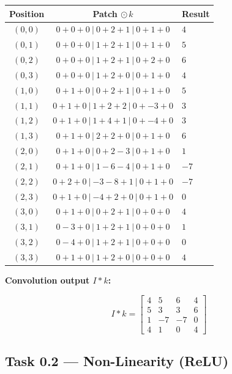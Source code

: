\documentclass[12pt,a4paper]{article}
\begin{document}
\medskip
\begin{center}
\renewcommand{\arraystretch}{1.3}
\begin{tabular}{ccl}
\toprule
Position & Patch $\odot\, k$ & Result \\
\midrule
$(0,0)$ & $0{+}0{+}0\ |\ 0{+}2{+}1\ |\ 0{+}1{+}0$ & $4$ \\
$(0,1)$ & $0{+}0{+}0\ |\ 1{+}2{+}1\ |\ 0{+}1{+}0$ & $5$ \\
$(0,2)$ & $0{+}0{+}0\ |\ 1{+}2{+}1\ |\ 0{+}2{+}0$ & $6$ \\
$(0,3)$ & $0{+}0{+}0\ |\ 1{+}2{+}0\ |\ 0{+}1{+}0$ & $4$ \\
$(1,0)$ & $0{+}1{+}0\ |\ 0{+}2{+}1\ |\ 0{+}1{+}0$ & $5$ \\
$(1,1)$ & $0{+}1{+}0\ |\ 1{+}2{+}2\ |\ 0{+}{-3}{+}0$ & $3$ \\
$(1,2)$ & $0{+}1{+}0\ |\ 1{+}4{+}1\ |\ 0{+}{-4}{+}0$ & $3$ \\
$(1,3)$ & $0{+}1{+}0\ |\ 2{+}2{+}0\ |\ 0{+}1{+}0$ & $6$ \\
$(2,0)$ & $0{+}1{+}0\ |\ 0{+}2{-}3\ |\ 0{+}1{+}0$ & $1$ \\
$(2,1)$ & $0{+}1{+}0\ |\ 1{-}6{-}4\ |\ 0{+}1{+}0$ & $-7$ \\
$(2,2)$ & $0{+}2{+}0\ |\ {-3}{-}8{+}1\ |\ 0{+}1{+}0$ & $-7$ \\
$(2,3)$ & $0{+}1{+}0\ |\ {-4}{+}2{+}0\ |\ 0{+}1{+}0$ & $0$ \\
$(3,0)$ & $0{+}1{+}0\ |\ 0{+}2{+}1\ |\ 0{+}0{+}0$ & $4$ \\
$(3,1)$ & $0{-}3{+}0\ |\ 1{+}2{+}1\ |\ 0{+}0{+}0$ & $1$ \\
$(3,2)$ & $0{-}4{+}0\ |\ 1{+}2{+}1\ |\ 0{+}0{+}0$ & $0$ \\
$(3,3)$ & $0{+}1{+}0\ |\ 1{+}2{+}0\ |\ 0{+}0{+}0$ & $4$ \\
\bottomrule
\end{tabular}
\end{center}

\textbf{Convolution output $I * k$:}

\[
I * k =
\begin{bmatrix}
 4 &  5 &  6 & 4\\
 5 &  3 &  3 & 6\\
 1 & -7 & -7 & 0\\
 4 &  1 &  0 & 4
\end{bmatrix}
\]

\subsection{Task 0.2 — Non-Linearity (ReLU)}
\end{document}
